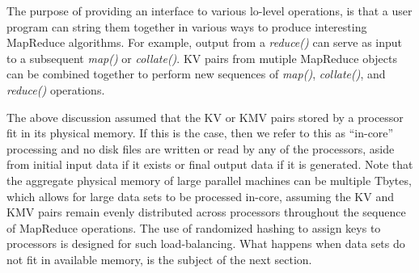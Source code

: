 The purpose of providing an interface to various lo-level operations,
is that a user program can string them together in various ways to
produce interesting MapReduce algorithms.  For example, output from a
{\it reduce()} can serve as input to a subsequent {\it map()} or {\it
collate()}.  KV pairs from mutiple MapReduce objects can be combined
together to perform new sequences of {\it map()}, {\it collate()}, and
{\it reduce()} operations.

The above discussion assumed that the KV or KMV pairs stored by a
processor fit in its physical memory.  If this is the case, then we
refer to this as ``in-core'' processing and no disk files are written
or read by any of the processors, aside from initial input data if it
exists or final output data if it is generated.  Note that the
aggregate physical memory of large parallel machines can be multiple
Tbytes, which allows for large data sets to be processed in-core,
assuming the KV and KMV pairs remain evenly distributed across
processors throughout the sequence of MapReduce operations.  The use
of randomized hashing to assign keys to processors is designed for
such load-balancing.  What happens when data sets do not
fit in available memory, is the subject of the next section.
